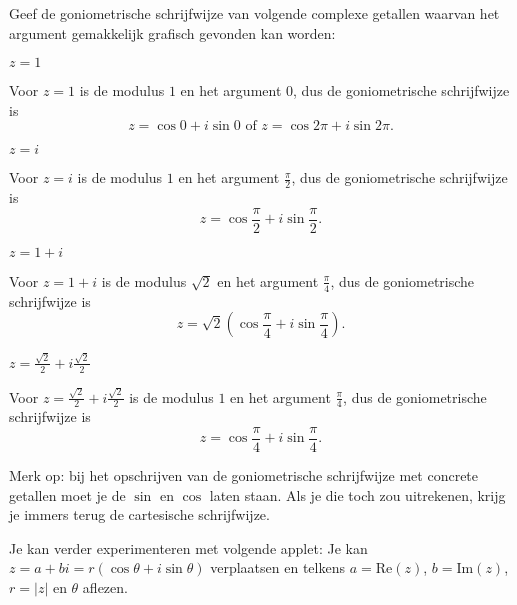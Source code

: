 \documentclass{ximera}
\begin{document}
\begin{exercise}\nl
    Geef de goniometrische schrijfwijze van volgende complexe getallen waarvan het argument gemakkelijk grafisch gevonden kan worden:
    \begin{question} $z=1 $
        \begin{oplossing}
          Voor $z=1 $ is de modulus $1$ en het argument $0$, dus de goniometrische schrijfwijze is $$z= \cos 0 + i\sin 0 \text{  of  } z= \cos 2\pi + i\sin 2\pi.$$
        \end{oplossing}
    \end{question}
\begin{question} $z=i $
    \begin{oplossing}
     Voor $z=i $ is de modulus $1$ en het argument $\frac{\pi}{2}$, dus de goniometrische schrijfwijze is $$z= \cos\frac{\pi}{2} + i \sin \frac{\pi}{2}.$$  
    \end{oplossing}
\end{question}
    \begin{question} $z=1+i$
        \begin{oplossing}
            Voor $z=1+i$ is de modulus $\sqrt{2}$ en het argument $\frac{\pi}{4}$, dus de goniometrische schrijfwijze is $$z= \sqrt{2}(\cos \frac{\pi}{4}+i\sin\frac{\pi}{4}).$$ 
        \end{oplossing}
    \end{question}
    \begin{question} $z=\frac{\sqrt2}{2}+i\frac{\sqrt2}{2}$
        \begin{oplossing}
            Voor $z=\frac{\sqrt2}{2}+i\frac{\sqrt2}{2}$ is de modulus $1$ en het argument $\frac{\pi}{4}$, dus de goniometrische schrijfwijze is $$z = \cos \frac{\pi}{4}+i\sin\frac{\pi}{4}.$$
        \end{oplossing}
    \end{question}
     
    Merk op: bij het opschrijven van de goniometrische schrijfwijze met concrete getallen moet je de $\sin$ en $\cos$ laten staan. Als je die toch zou uitrekenen, krijg je immers terug de cartesische schrijfwijze.
\end{exercise}
 


 
\begin{basicSkip}
Je kan verder experimenteren met volgende applet: Je kan $z= a+bi=r(\cos \theta+ i  \sin \theta)$ verplaatsen en telkens $a=\text{Re}(z)$, $b=\text{Im}(z)$, $r=|z|$ en $\theta$ aflezen.
 
\end{basicSkip}
 
\end{document}
